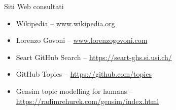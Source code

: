 \cleardoublepage
{}
{}
\nocite{*}



\vspace{0.5cm}
\begin{Large}Siti Web consultati\end{Large}
\begin{itemize}
    \item Wikipedia -- \url{www.wikipedia.org}
    \item Lorenzo Govoni -- \url{www.lorenzogovoni.com}
    \item Seart GitHub Search -- \url{https://seart-ghs.si.usi.ch/}
    \item GitHub Topics -- \url{https://github.com/topics}
    \item Gensim topic modelling for humans -- \url{https://radimrehurek.com/gensim/index.html}
\end{itemize}

